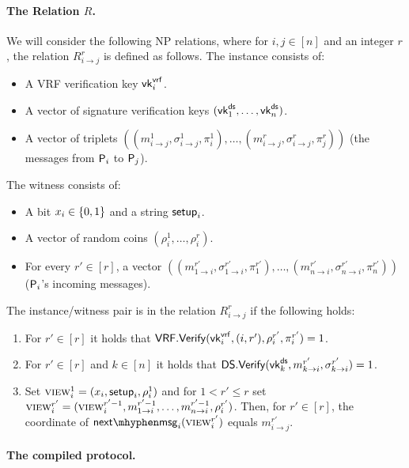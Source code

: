 
\paragraph{The Relation $R$.}


We will consider the following NP relations, where for $i,j\in[n]$ and an integer $r$, the relation $R^r_{i\to j}$ is defined as follows.
The instance consists of:
\begin{itemize}
	\item
	A VRF verification key $\mathsf{vk}^{\mathsf{vrf}}_i$.
	\item
	A vector of signature verification keys $(\mathsf{vk}^{\mathsf{ds}}_1,\ldots,\mathsf{vk}^{\mathsf{ds}}_n)$.
	\item
	A vector of triplets $((m_{i\to j}^1,\sigma_{i\to j}^1,\pi_i^1),\ldots,(m_{i\to j}^r,\sigma_{i\to j}^r,\pi_j^r))$ (the messages from $\mathsf{P}_i$ to $\mathsf{P}_j$).
\end{itemize}
The witness consists of:
\begin{itemize}
	\item
	A bit $x_i\in\{0,1\}$ and a string $\mathsf{setup}_i$.
	\item
	A vector of random coins $(\rho_i^1,\ldots,\rho_i^r)$.
	\item
	For every $r'\in[r]$, a vector $((m^{r'}_{1\to i},\sigma^{r'}_{1\to i},\pi^{r'}_1),\ldots,(m^{r'}_{n\to i},\sigma^{r'}_{n\to i},\pi^{r'}_n))$ ($\mathsf{P}_i$'s incoming messages).
\end{itemize}
The instance/witness pair is in the relation $R^r_{i\to j}$ if the following holds:
\begin{enumerate}
	\item
	For $r'\in[r]$ it holds that $\mathsf{VRF.Verify}(\mathsf{vk}^{\mathsf{vrf}}_i,(i,r'),\rho_i^{r'},\pi_i^{r'})=1$.
	\item
	For $r'\in[r]$ and $k\in[n]$ it holds that $\mathsf{DS.Verify}(\mathsf{vk}^{\mathsf{ds}}_k,m^{r'}_{k\to i},\sigma^{r'}_{k\to i})=1$.
	\item
	Set $\textsc{view}_i^1=(x_i,\mathsf{setup}_i,\rho_i^1)$ and for $1<r'\leq r$ set $\textsc{view}_i^{r'}=(\textsc{view}_i^{r'-1},m_{1\to i}^{r'-1},\ldots,m_{n\to i}^{r'-1},\rho_i^{r'})$. Then, for $r'\in[r]$, the \jth coordinate of $\nextmsg_i(\view_i^{r'})$ equals $m_{i\to j}^{r'}$.
\end{enumerate}








 \paragraph{The compiled protocol.}~

